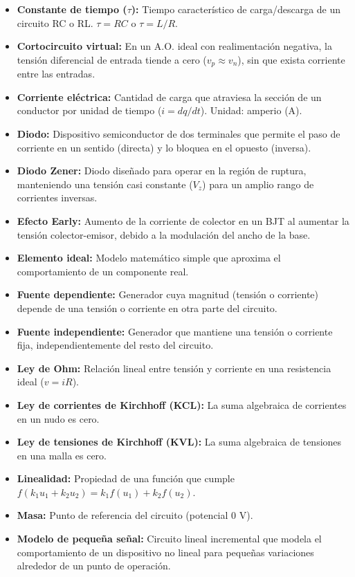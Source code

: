 \documentclass[11pt,a4paper]{article}
\begin{document}
\begin{itemize}[leftmargin=*,topsep=2pt,itemsep=1pt]
  \item \textbf{Constante de tiempo ($\tau$):} Tiempo característico de carga/descarga de un circuito RC o RL. $\tau = RC$ o $\tau = L/R$.
  \item \textbf{Cortocircuito virtual:} En un A.O. ideal con realimentación negativa, la tensión diferencial de entrada tiende a cero ($v_p \approx v_n$), sin que exista corriente entre las entradas.
  \item \textbf{Corriente eléctrica:} Cantidad de carga que atraviesa la sección de un conductor por unidad de tiempo ($i = dq/dt$). Unidad: amperio (A).
  \item \textbf{Diodo:} Dispositivo semiconductor de dos terminales que permite el paso de corriente en un sentido (directa) y lo bloquea en el opuesto (inversa).
  \item \textbf{Diodo Zener:} Diodo diseñado para operar en la región de ruptura, manteniendo una tensión casi constante ($V_z$) para un amplio rango de corrientes inversas.
  \item \textbf{Efecto Early:} Aumento de la corriente de colector en un BJT al aumentar la tensión colector-emisor, debido a la modulación del ancho de la base.
  \item \textbf{Elemento ideal:} Modelo matemático simple que aproxima el comportamiento de un componente real.
  \item \textbf{Fuente dependiente:} Generador cuya magnitud (tensión o corriente) depende de una tensión o corriente en otra parte del circuito.
  \item \textbf{Fuente independiente:} Generador que mantiene una tensión o corriente fija, independientemente del resto del circuito.
  \item \textbf{Ley de Ohm:} Relación lineal entre tensión y corriente en una resistencia ideal ($v = iR$).
  \item \textbf{Ley de corrientes de Kirchhoff (KCL):} La suma algebraica de corrientes en un nudo es cero.
  \item \textbf{Ley de tensiones de Kirchhoff (KVL):} La suma algebraica de tensiones en una malla es cero.
  \item \textbf{Linealidad:} Propiedad de una función que cumple $f(k_1 u_1 + k_2 u_2) = k_1 f(u_1) + k_2 f(u_2)$.
  \item \textbf{Masa:} Punto de referencia del circuito (potencial 0 V).
  \item \textbf{Modelo de pequeña señal:} Circuito lineal incremental que modela el comportamiento de un dispositivo no lineal para pequeñas variaciones alrededor de un punto de operación.

\end{itemize}
\end{document}
